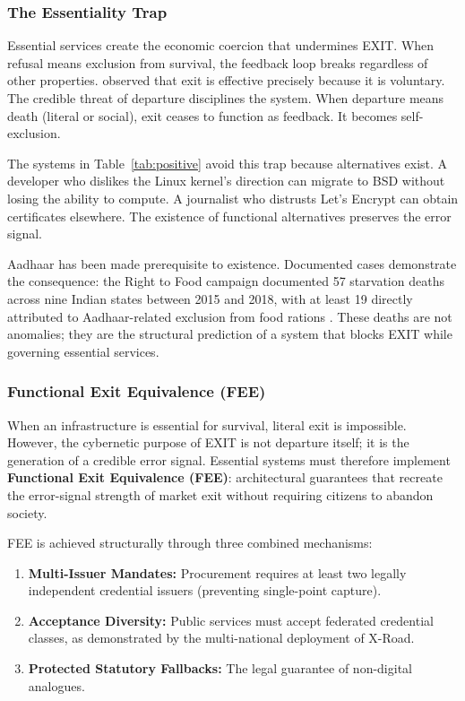 \documentclass{article}
\begin{document}
\subsubsection{The Essentiality Trap}

Essential services create the economic coercion that undermines EXIT. When refusal means exclusion from survival, the feedback loop breaks regardless of other properties. \citet{hirschman1970} observed that exit is effective precisely because it is voluntary. The credible threat of departure disciplines the system. When departure means death (literal or social), exit ceases to function as feedback. It becomes self-exclusion.

The systems in Table~\ref{tab:positive} avoid this trap because alternatives exist. A developer who dislikes the Linux kernel's direction can migrate to BSD without losing the ability to compute. A journalist who distrusts Let's Encrypt can obtain certificates elsewhere. The existence of functional alternatives preserves the error signal.

Aadhaar has been made prerequisite to existence. Documented cases demonstrate the consequence: the Right to Food campaign documented 57 starvation deaths across nine Indian states between 2015 and 2018, with at least 19 directly attributed to Aadhaar-related exclusion from food rations \citep{khera2017}. These deaths are not anomalies; they are the structural prediction of a system that blocks EXIT while governing essential services.

\subsubsection{Functional Exit Equivalence (FEE)}
\label{subsubsec:fee}

When an infrastructure is essential for survival, literal exit is impossible. However, the cybernetic purpose of EXIT is not departure itself; it is the generation of a credible error signal. Essential systems must therefore implement \textbf{Functional Exit Equivalence (FEE)}: architectural guarantees that recreate the error-signal strength of market exit without requiring citizens to abandon society.

FEE is achieved structurally through three combined mechanisms:
\begin{enumerate}[noitemsep]
    \item \textbf{Multi-Issuer Mandates:} Procurement requires at least two legally independent credential issuers (preventing single-point capture).
    \item \textbf{Acceptance Diversity:} Public services must accept federated credential classes, as demonstrated by the multi-national deployment of X-Road.
    \item \textbf{Protected Statutory Fallbacks:} The legal guarantee of non-digital analogues.
\end{enumerate}
\end{document}
